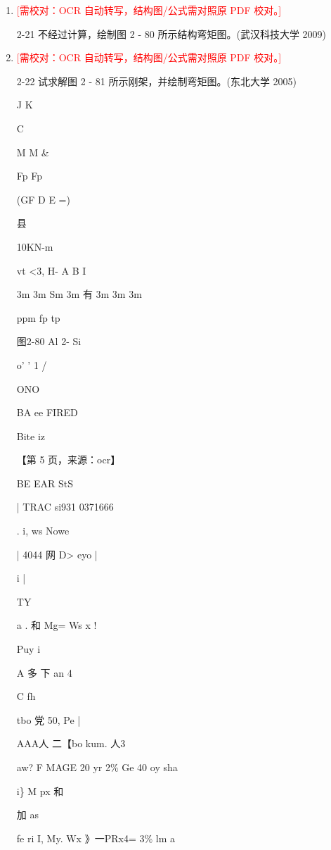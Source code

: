 \documentclass[UTF8,12pt,a4paper,openany]{ctexbook}
\newcommand{\TODO}[1]{\textcolor{red}{[需校对：#1]}}
\begin{document}
\begin{enumerate}[label=\textbf{\arabic*.},leftmargin=2em]
\item \TODO{OCR 自动转写，结构图/公式需对照原 PDF 校对。}\par 2-21 不经过计算，绘制图 2 - 80 所示结构弯矩图。(武汉科技大学 2009)
\item \TODO{OCR 自动转写，结构图/公式需对照原 PDF 校对。}\par 2-22 试求解图 2 - 81 所示刚架，并绘制弯矩图。(东北大学 2005)\par J                        K\par C\par M                                              M \&\par Fp                Fp\par (GF       D                         E       =)\par 县\par 10KN-m\par vt <3,            H-        A                   B           I\par 3m     3m          Sm    3m    有     3m         3m          3m\par ppm fp tp\par 图2-80                                                         Al 2- Si\par o’ ' 1 /\par ONO\par BA ee FIRED\par Bite iz\par \par 【第 5 页，来源：ocr】\par BE EAR StS\par |          TRAC si931 0371666\par .     i,          ws Nowe\par |       4044     网          D> eyo                             |\par i                                                                             |\par TY\par a                 . 和          Mg= Ws     x                          !\par Puy i\par A           多      下 an                                                      4\par C  fh\par tbo                               党         50,         Pe  |\par AAA人           二【bo kum.                 人3\par aw?           F   MAGE 20 yr 2\% Ge 40 oy       sha\par i\}                                 M px                              和\par 加      as\par fe       ri I,        My. Wx 》一PRx4= 3\% lm                      a\par 
\end{enumerate}
\end{document}
